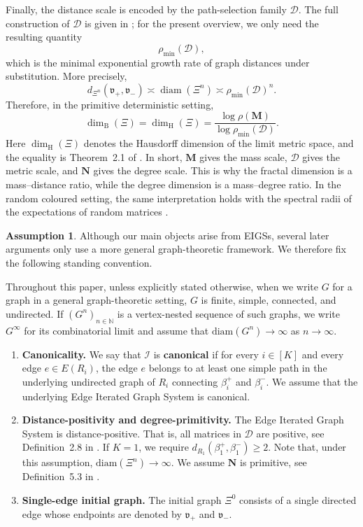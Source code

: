 \documentclass{article}
\theoremstyle{plain}
\theoremstyle{definition}
\newtheorem{assumption}[theorem]{Assumption}
\newcommand{\diam}{\mathrm{diam}}
\newcommand{\dimbox}{\dim_\mathrm{B}}
\newcommand{\dimhaus}{\dim_\mathrm{H}}
\begin{document}
Finally, the distance scale is encoded by the path-selection family \(\mathcal D\). The full construction of \(\mathcal D\) is given in \cite{neroli2024fractal}; for the present overview, we only need the resulting quantity
\[
    \rho_{\min}(\mathcal D),
\]
which is the minimal exponential growth rate of graph distances under substitution. More precisely,
\[
    d_{\Xi^n}(\mathfrak v_+,\mathfrak v_-)
    \asymp
    \operatorname{diam}(\Xi^n)
    \asymp
    \rho_{\min}(\mathcal D)^n .
\]
Therefore, in the primitive deterministic setting,
\[
    \dimbox(\Xi)
    =
    \dimhaus(\Xi)
    =
    \frac{\log \rho(\mathbf M)}
         {\log \rho_{\min}(\mathcal D)} .
\]
Here $\dimhaus(\Xi)$ denotes the Hausdorff dimension of the limit metric space, and the equality is Theorem~2.1 of \cite{neroli2024fractal}.
In short, \(\mathbf M\) gives the mass scale, \(\mathcal D\) gives the metric scale, and \(\mathbf N\) gives the degree scale. This is why the fractal dimension is a mass--distance ratio, while the degree dimension is a mass--degree ratio. 
In the random coloured setting, the same interpretation holds with the spectral radii of the expectations of random matrices \cite{hambly2010diffusion}.

\bigskip

\begin{assumption}\label{ass:standing}
Although our main objects arise from EIGSs, several later arguments only use a more general graph-theoretic framework.
We therefore fix the following standing convention.

Throughout this paper, unless explicitly stated otherwise, when we write $G$ for a graph in a general graph-theoretic setting, $G$ is finite, simple, connected, and undirected.
If $(G^n)_{n\in\mathbb N}$ is a vertex-nested sequence of such graphs, we write $G^\infty$ for its combinatorial limit and assume that $\diam(G^n)\to\infty$ as $n\to\infty$.

\begin{enumerate}
\item \textbf{Canonicality.}
We say that $\mathscr I$ is \textbf{canonical} if for every $i\in[K]$ and every edge $e\in E(R_i)$, the edge $e$ belongs to at least one simple path in the underlying undirected graph of $R_i$ connecting $\beta_i^+$ and $\beta_i^-$.
We assume that the underlying Edge Iterated Graph System is canonical.

\item \textbf{Distance-positivity and degree-primitivity.}
The Edge Iterated Graph System is distance-positive.
That is, all matrices in $\mathcal D$ are positive, see Definition~2.8 in \cite{neroli2024fractal}.
If $K=1$, we require $d_{R_1}(\beta_1^+,\beta_1^-) \geq 2$.
Note that, under this assumption, $\diam(\Xi^n)\to\infty$.
We assume $\mathbf N$ is primitive, see Definition~5.3 in \cite{li2024on}.

\item \textbf{Single-edge initial graph.}
The initial graph $\Xi^{0}$ consists of a single directed edge whose endpoints are denoted by $\mathfrak v_{+}$ and $\mathfrak v_{-}$.
\end{enumerate}
\end{assumption}
\end{document}
